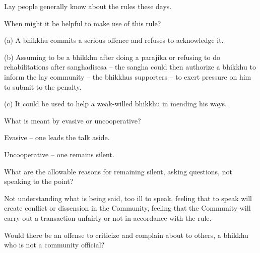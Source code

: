 \bigskip

\begin{solution}
  Lay people generally know about the rules these days.
\end{solution}

When might it be helpful to make use of this rule?

\bigskip

\begin{solution}
  (a) A bhikkhu commits a serious offence and refuses to acknowledge it.
 
  (b) Assuming to be a bhikkhu after doing a parajika or refusing to do
  rehabilitations after sanghadisesa – the sangha could then authorize a bhikkhu
  to inform the lay community – the bhikkhus supporters – to exert pressure on
  him to submit to the penalty.
 
  (c) It could be used to help a weak-willed bhikkhu in mending his ways.
\end{solution}


What is meant by evasive or uncooperative? 

\begin{solution}
  Evasive – one leads the talk aside.
  
  Uncooperative – one remains silent.
\end{solution}

\bigskip

What are the allowable reasons for remaining silent, asking questions, not speaking to the point?

\begin{solution}
  Not understanding what is being said, too ill to speak, feeling that to speak
  will create conflict or dissension in the Community, feeling that the Community
  will carry out a transaction unfairly or not in accordance with the rule.
\end{solution}

\bigskip


Would there be an offense to criticize and complain about to others, a bhikkhu
who is not a community official?


